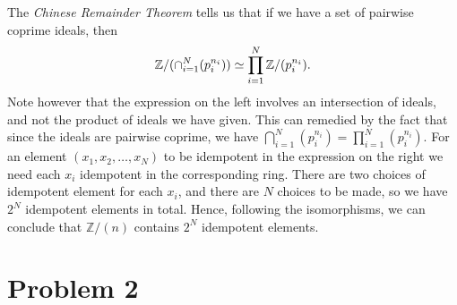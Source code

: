 \documentclass{article}
\newcommand{\Z}{\mathbb{Z}}
\begin{document}
\begin{enumerate}[(i)]
            The \emph{Chinese Remainder Theorem} tells us that if we have a set
            of pairwise coprime ideals, then
            \begin{equation}
                \notag
                \Z / ( \cap_{i = 1}^{N} (p_i^{n_i}) ) \simeq \prod_{i = 1}^{N} \Z / (p_i^{n_i}).
            \end{equation}
            Note however that the expression on the left involves an
            intersection of ideals, and not the product of ideals we have
            given. This can remedied by the fact that since the ideals are
            pairwise coprime, we have $\bigcap_{i=1}^N (p_i^{n_i}) =
            \prod_{i=1}^N (p_i^{n_i})$. For an element $(x_1, x_2, \ldots,
            x_N)$ to be idempotent in the expression on the right we need each
            $x_i$ idempotent in the corresponding ring. There are two choices
            of idempotent element for each $x_i$, and there are $N$ choices to
            be made, so we have $2^N$ idempotent elements in total. Hence,
            following the isomorphisms, we can conclude that $\Z / (n)$
            contains $2^N$ idempotent elements.

\end{enumerate} 

    \section*{Problem 2}
    \label{sec:problem_2}
        
\end{document}
